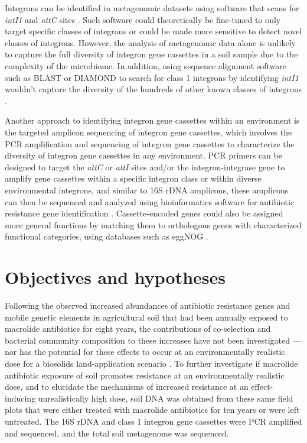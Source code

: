 Integrons can be identified in metagenomic datasets using software that scans for \textit{intI1} and \textit{attC} sites \parencite{Cury.2016}.
Such software could theoretically be fine-tuned to only target specific classes of integrons or could be made more sensitive to detect novel classes of integrons.
However, the analysis of metagenomic data alone is unlikely to capture the full diversity of integron gene cassettes in a soil sample due to the complexity of the microbiome.
In addition, using sequence alignment software such as BLAST or DIAMOND to search for class 1 integrons by identifying \textit{intI1} wouldn’t capture the diversity of the hundreds of other known classes of integrons \parencite{Altschul.1990, Buchfink.2015}.

Another approach to identifying integron gene cassettes within an environment is the targeted amplicon sequencing of integron gene cassettes, which involves the PCR amplification and sequencing of integron gene cassettes to characterize the diversity of integron gene cassettes in any environment.
PCR primers can be designed to target the \textit{attC} or \textit{attI} sites and/or the integron-integrase gene to amplify gene cassettes within a specific integron class or within diverse environmental integrons, and similar to 16S rDNA amplicons, these amplicons can then be sequenced and analyzed using bioinformatics software for antibiotic resistance gene identification \parencite{Yang.2021, Ghaly.2019}.
Cassette-encoded genes could also be assigned more general functions by matching them to orthologous genes with characterized functional categories, using databases such as eggNOG \parencite{HuertaCepas.2019}.

\section{Objectives and hypotheses}

Following the observed increased abundances of antibiotic resistance genes and mobile genetic elements in agricultural soil that had been annually exposed to macrolide antibiotics for eight years, the contributions of co-selection and bacterial community composition to these increases have not been investigated --- nor has the potential for these effects to occur at an environmentally realistic dose for a biosolids land-application scenario \parencite{Lau.2020}.
To further investigate if macrolide antibiotic exposure of soil promotes resistance at an environmentally realistic dose, and to elucidate the mechanisms of increased resistance at an effect-inducing unrealistically high dose, soil DNA was obtained from these same field plots that were either treated with macrolide antibiotics for ten years or were left untreated.
The 16S rDNA and class 1 integron gene cassettes were PCR amplified and sequenced, and the total soil metagenome was sequenced.

